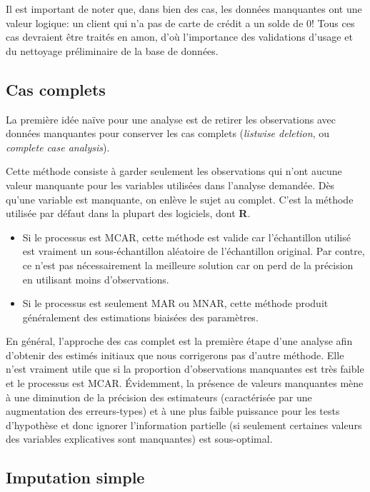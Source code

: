 \documentclass[
  11pt,
  letterpaper,
]{scrbook}
\providecommand{\tightlist}{%
  \setlength{\itemsep}{0pt}\setlength{\parskip}{0pt}}\usepackage{longtable,booktabs,array}
\theoremstyle{definition}
\theoremstyle{remark}
\begin{document}
Il est important de noter que, dans bien des cas, les données manquantes
ont une valeur logique: un client qui n'a pas de carte de crédit a un
solde de 0! Tous ces cas devraient être traités en amon, d'où
l'importance des validations d'usage et du nettoyage préliminaire de la
base de données.

\hypertarget{cas-complets}{%
\subsection{Cas complets}\label{cas-complets}}

La première idée naïve pour une analyse est de retirer les observations
avec données manquantes pour conserver les cas complets (\emph{listwise
deletion}, ou \emph{complete case analysis}).

Cette méthode consiste à garder seulement les observations qui n'ont
aucune valeur manquante pour les variables utilisées dans l'analyse
demandée. Dès qu'une variable est manquante, on enlève le sujet au
complet. C'est la méthode utilisée par défaut dans la plupart des
logiciels, dont \textbf{R}.

\begin{itemize}
\tightlist
\item
  Si le processus est MCAR, cette méthode est valide car l'échantillon
  utilisé est vraiment un sous-échantillon aléatoire de l'échantillon
  original. Par contre, ce n'est pas nécessairement la meilleure
  solution car on perd de la précision en utilisant moins
  d'observations.
\item
  Si le processus est seulement MAR ou MNAR, cette méthode produit
  généralement des estimations biaisées des paramètres.
\end{itemize}

En général, l'approche des cas complet est la première étape d'une
analyse afin d'obtenir des estimés initiaux que nous corrigerons pas
d'autre méthode. Elle n'est vraiment utile que si la proportion
d'observations manquantes est très faible et le processus est MCAR.
Évidemment, la présence de valeurs manquantes mène à une diminution de
la précision des estimateurs (caractérisée par une augmentation des
erreurs-types) et à une plus faible puissance pour les tests d'hypothèse
et donc ignorer l'information partielle (si seulement certaines valeurs
des variables explicatives sont manquantes) est sous-optimal.

\hypertarget{imputation-simple}{%
\subsection{Imputation simple}\label{imputation-simple}}
\end{document}
